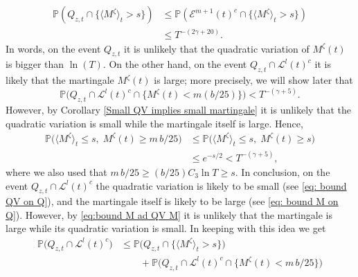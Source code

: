 \documentclass[11pt]{article}
\makeatletter
\renewenvironment{proof}[1][\proofname]{
   \par\pushQED{\qed}\normalfont
   \topsep6\p@\@plus6\p@\relax
   \trivlist\item[\hskip\labelsep\bfseries#1\@addpunct{.}]
   \ignorespaces
}{
   \popQED\endtrivlist\@endpefalse
}
\numberwithin{equation}{section}
\def\MZT{M^{\zeta}(t)}
\def\LLT{\mathcal{L}^{l}(t)}
\makeatother
\begin{document}
\begin{proof}[Proof of Lemma \ref{Early Points Imply Late Points}]
\begin{equation}
    \begin{split}
      \mathbb{P}(Q_{z,t} \cap 
      \{ \langle M^{\zeta} \rangle _t > s \} )
      &\leq 
      \mathbb{P}(\mathcal{E}^{m+1} (t)^c \cap 
      \{ \langle M^{\zeta} \rangle _t > s \} )\\
      &\leq T^{-(2\gamma + 20)}. 
    \end{split}
  \end{equation}
  In words, on the event $Q_{z,t}$ it is unlikely that 
  the quadratic variation of $\MZT$ is bigger than $\ln (T)$.
  On the other hand, on the event $Q_{z,t} \cap \LLT^c$ it is likely that the martingale
  $\MZT$ is large; more precisely, we will show later that
  \begin{equation}
    \label{eq: bound M on Q}
    \mathbb{P} \big(
      Q_{z,t} \cap \LLT^c \cap \{ \MZT < m (b/25)\}
    \big) 
    < T^{-(\gamma + 5)}. 
  \end{equation}
  However, by Corollary \ref{Small QV implies small martingale} 
  it is unlikely that the quadratic variation is small while the martingale 
  itself is large. Hence, 
  \begin{equation}\label{eq:bound M ad QV M}
    \begin{split}
      \mathbb{P} \big(
        \langle M^{\zeta} \rangle _t \leq s 
        , \; \MZT \geq m \, b/25 
      \big) 
      & \leq 
      \mathbb{P} \big(
        \langle M^{\zeta} \rangle _t \leq s , \; \MZT \geq s 
        \big) \\
      & \leq e^{-s/2} < T^{-(\gamma + 5)},
    \end{split}
  \end{equation}
  where we also used that $m \,b/25 \geq (b/25) C_3 \ln T \geq s$. 
  In conclusion, on the event  
  $Q_{z,t} \cap \LLT^c$ the quadratic variation is likely to be small (see 
  \eqref{eq: bound QV on Q}), and the martingale itself
  is likely to be large (see \eqref{eq: bound M on Q}). 
  However, by \eqref{eq:bound M ad QV M} it is 
  unlikely that the martingale is large while 
  its quadratic variation is small. 
  In keeping with this idea we get
  \begin{equation}\label{eq: Q cap L leq}
    \begin{split}
        \mathbb{P}\big(Q_{z,t} \cap \LLT^c \big) 
      & \leq \mathbb{P} \big(
        Q_{z,t} \cap 
          \{ \langle M^{\zeta} \rangle _t > s \} \big) \\
      & \qquad + \mathbb{P} \big( 
        Q_{z,t} \cap \LLT^c \cap \{ \MZT < m \,b/25 \}\big)\\

\end{split}
\end{equation}
\end{proof}
\end{document}
